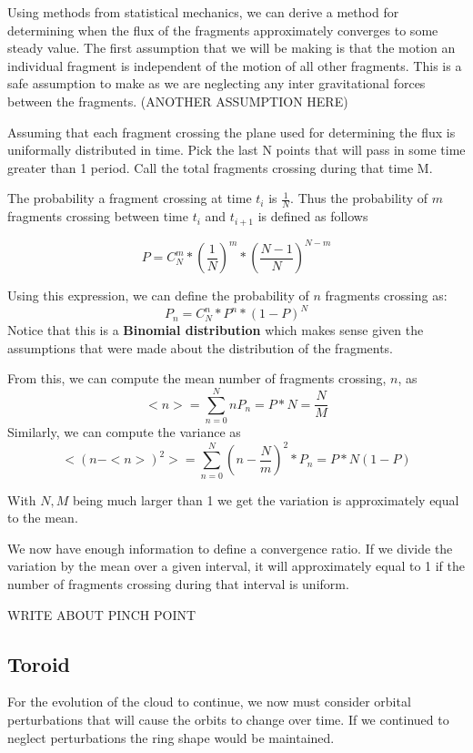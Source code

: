 \documentclass{article}
\newcommand{\boldindex}[1]{%
	\textbf{#1}\index{#1}%
}
\begin{document}
 Using methods from statistical mechanics, we can derive a method for determining when the flux of the fragments approximately converges to some steady value.
 The first assumption that we will be making is that the motion an individual fragment is independent of the motion of all other fragments. This is a safe assumption to make as we are neglecting any inter gravitational forces between the fragments. (ANOTHER ASSUMPTION HERE)
 
 Assuming that each fragment crossing the plane used for determining the flux is uniformally distributed in time. Pick the last N points that will pass in some time greater than 1 period. Call the total fragments crossing during that time M.
 
 The probability a fragment crossing at time $t_i$ is $\frac{1}{N}$. Thus the probability of $m$ fragments crossing between time $t_i$ and $t_{i+1}$ is defined as follows
 
 \begin{equation}
 	P = C^m_N * (\frac{1}{N})^m * (\frac{N - 1}{N})^{N-m}
 \end{equation}

\noindent Using this expression, we can define the probability of $n$ fragments crossing as:
\begin{equation}
	P_n = C^n_N * P^n * (1 - P)^N
\end{equation}
Notice that this is a \boldindex{Binomial distribution} which makes sense given the assumptions that were made about the distribution of the fragments.

From this, we can compute the mean number of fragments crossing, $n$, as
\begin{equation}
	<n> = \sum_{n=0}^{N} n P_n = P * N = \frac{N}{M}
\end{equation}
Similarly, we can compute the variance as
\begin{equation}
	<(n-<n>)^2> = \sum_{n=0}^{N}(n - \frac{N}{m})^2 * P_n = P * N (1 - P)
\end{equation}

With $N, M$ being much larger than 1 we get the variation is approximately equal to the mean.

We now have enough information to define a convergence ratio. If we divide the variation by the mean over a given interval, it will approximately equal to 1 if the number of fragments crossing during that interval is uniform.

WRITE ABOUT PINCH POINT

\subsection{Toroid}
For the evolution of the cloud to continue, we now must consider orbital perturbations that will cause the orbits to change over time. If we continued to neglect perturbations the ring shape would be maintained.
\end{document}
